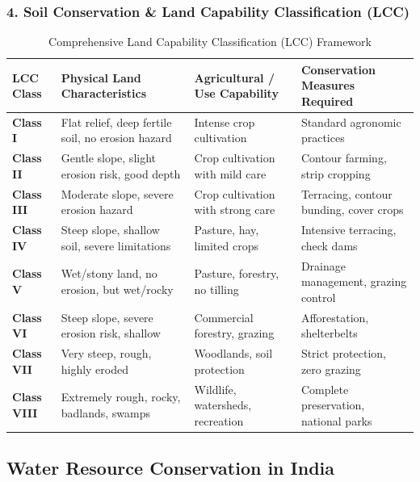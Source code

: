 \documentclass[11pt,a4paper]{article}
\begin{document}
\subsubsection{4. Soil Conservation \& Land Capability Classification (LCC)}
\begin{table}[h!]
\centering
\small
\begin{tabularx}{\textwidth}{l X X X}
\toprule
\textbf{LCC Class} & \textbf{Physical Land Characteristics} & \textbf{Agricultural / Use Capability} & \textbf{Conservation Measures Required} \\
\midrule
\textbf{Class I} & Flat relief, deep fertile soil, no erosion hazard & Intense crop cultivation & Standard agronomic practices \\
\textbf{Class II} & Gentle slope, slight erosion risk, good depth & Crop cultivation with mild care & Contour farming, strip cropping \\
\textbf{Class III} & Moderate slope, severe erosion hazard & Crop cultivation with strong care & Terracing, contour bunding, cover crops \\
\textbf{Class IV} & Steep slope, shallow soil, severe limitations & Pasture, hay, limited crops & Intensive terracing, check dams \\
\textbf{Class V} & Wet/stony land, no erosion, but wet/rocky & Pasture, forestry, no tilling & Drainage management, grazing control \\
\textbf{Class VI} & Steep slope, severe erosion risk, shallow & Commercial forestry, grazing & Afforestation, shelterbelts \\
\textbf{Class VII} & Very steep, rough, highly eroded & Woodlands, soil protection & Strict protection, zero grazing \\
\textbf{Class VIII} & Extremely rough, rocky, badlands, swamps & Wildlife, watersheds, recreation & Complete preservation, national parks \\
\bottomrule
\end{tabularx}
\caption{Comprehensive Land Capability Classification (LCC) Framework}
\end{table}

\subsection{Water Resource Conservation in India}
\end{document}
